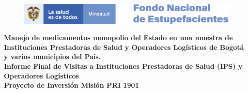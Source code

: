 \hypertarget{TitlePage}{}
\begin{center}
	\begin{figure}
		\centering
		\includegraphics[width=\linewidth]{www/logos_MinSalud_FNE.png}
	\end{figure}
	\thispagestyle{empty} 
	\vspace*{0.5cm}	
	\huge{\bfseries\sffamily\textbf{
			Manejo de medicamentos monopolio del Estado en una muestra de Instituciones Prestadoras de Salud y Operadores Logísticos de Bogotá y varios municipios del País.}}\\[3.3cm]
	\Large{\bfseries\sffamily\textbf{
			Informe Final de Visitas a Instituciones Prestadoras de Salud (IPS) y Operadores Logísticos}}\\[3.3cm]	
	\Large{\bfseries\sffamily\textbf{
			Proyecto de Inversión Misión PRI 1901}}\\[3.4cm]
	\normalsize{}\\
\end{center}
